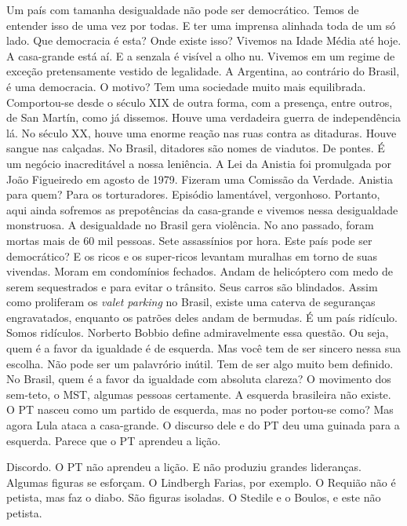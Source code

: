 \normalfont 
Um país com tamanha desigualdade não pode ser
democrático. Temos de entender isso de uma vez por todas. E ter uma
imprensa alinhada toda de um só lado. Que democracia é esta? Onde existe
isso? Vivemos na Idade Média até hoje. A casa-grande está aí. E a
senzala é visível a olho nu. Vivemos em um regime de exceção
pretensamente vestido de legalidade. A Argentina, ao contrário do
Brasil, é uma democracia. O motivo? Tem uma sociedade muito mais
equilibrada. Comportou-se desde o século XIX de outra forma, com a
presença, entre outros, de San Martín, como já dissemos. Houve uma
verdadeira guerra de independência lá. No século XX, houve uma enorme
reação nas ruas contra as ditaduras. Houve sangue nas calçadas. No
Brasil, ditadores são nomes de viadutos. De pontes. É um negócio
inacreditável a nossa leniência. A Lei da Anistia foi promulgada por
João Figueiredo em agosto de 1979. Fizeram uma Comissão da Verdade.
Anistia para quem? Para os torturadores. Episódio lamentável,
vergonhoso. Portanto, aqui ainda sofremos as prepotências da casa-grande
e vivemos nessa desigualdade monstruosa. A desigualdade no Brasil gera
violência. No ano passado, foram mortas mais de 60 mil pessoas. Sete
assassínios por hora. Este país pode ser democrático? E os ricos e os
super-ricos levantam muralhas em torno de suas vivendas. Moram em
condomínios fechados. Andam de helicóptero com medo de serem
sequestrados e para evitar o trânsito. Seus carros são blindados. Assim
como proliferam os \emph{valet parking} no Brasil, existe uma caterva de
seguranças engravatados, enquanto os patrões deles andam de bermudas. É
um país ridículo. Somos ridículos. Norberto Bobbio define admiravelmente
essa questão. Ou seja, quem é a favor da igualdade é de esquerda. Mas
você tem de ser sincero nessa sua escolha. Não pode ser um palavrório
inútil. Tem de ser algo muito bem definido. No Brasil, quem é a favor da
igualdade com absoluta clareza? O movimento dos sem-teto, o MST, algumas
pessoas certamente. A esquerda brasileira não existe. O PT nasceu como
um partido de esquerda, mas no poder portou-se como?
%
 Mas agora Lula ataca a casa-grande. O discurso dele e
do PT deu uma guinada para a esquerda. Parece que o PT aprendeu a lição.

\normalfont 
Discordo. O PT não aprendeu a lição. E não produziu
grandes lideranças. Algumas figuras se esforçam. O Lindbergh Farias, por
exemplo. O Requião não é petista, mas faz o diabo. São figuras isoladas.
O Stedile e o Boulos, e este não petista.

